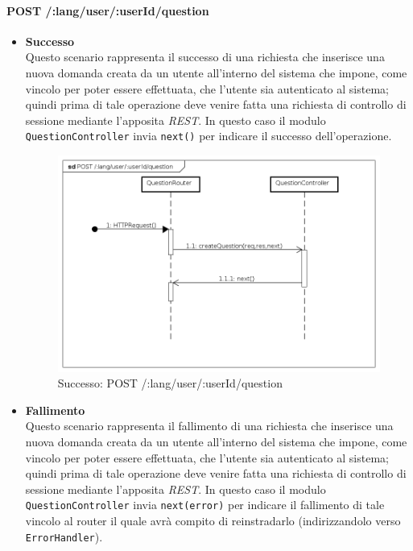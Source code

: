 \paragraph{POST /:lang/user/:userId/question}
\begin{itemize}
\item \textbf{Successo}\\
Questo scenario rappresenta il successo di una richiesta che inserisce una nuova domanda creata da un utente all'interno del sistema che impone, come vincolo per poter essere effettuata, che l'utente sia autenticato al sistema; quindi prima di tale operazione deve venire fatta una richiesta di controllo di sessione mediante l'apposita \textit{REST}. In questo caso il modulo \texttt{QuestionController} invia \texttt{next()} per indicare il successo dell'operazione.


\begin{figure}[ht]
	\centering
	\includegraphics[scale=0.45]{UML/DiagrammiDiSequenza/Back-end/POST__lang_user__userId_question_success.png}
	\caption{Successo: POST /:lang/user/:userId/question}
\end{figure}
\FloatBarrier

\item \textbf{Fallimento}\\
Questo scenario rappresenta il fallimento di una richiesta che inserisce una nuova domanda creata da un utente all'interno del sistema che impone, come vincolo per poter essere effettuata, che l'utente sia autenticato al sistema; quindi prima di tale operazione deve venire fatta una richiesta di controllo di sessione mediante l'apposita \textit{REST}. In questo caso il modulo \texttt{QuestionController} invia \texttt{next(error)} per indicare il fallimento di tale vincolo al router il quale avrà compito di reinstradarlo (indirizzandolo verso \texttt{ErrorHandler}).


\end{itemize}

